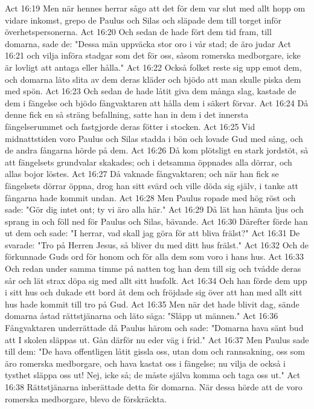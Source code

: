 Act 16:19  Men när hennes herrar sågo att det för dem var slut med allt hopp om vidare inkomst, grepo de Paulus och Silas och släpade dem till torget inför överhetspersonerna.
Act 16:20  Och sedan de hade fört dem tid fram, till domarna, sade de: "Dessa män uppväcka stor oro i vår stad; de äro judar
Act 16:21  och vilja införa stadgar som det för oss, såsom romerska medborgare, icke är lovligt att antaga eller hålla."
Act 16:22  Också folket reste sig upp emot dem, och domarna läto slita av dem deras kläder och bjödo att man skulle piska dem med spön.
Act 16:23  Och sedan de hade låtit giva dem många slag, kastade de dem i fängelse och bjödo fångvaktaren att hålla dem i säkert förvar.
Act 16:24  Då denne fick en så sträng befallning, satte han in dem i det innersta fängelserummet och fastgjorde deras fötter i stocken.
Act 16:25  Vid midnattstiden voro Paulus och Silas stadda i bön och lovade Gud med sång, och de andra fångarna hörde på dem.
Act 16:26  Då kom plötsligt en stark jordstöt, så att fängelsets grundvalar skakades; och i detsamma öppnades alla dörrar, och allas bojor löstes.
Act 16:27  Då vaknade fångvaktaren; och när han fick se fängelsets dörrar öppna, drog han sitt svärd och ville döda sig själv, i tanke att fångarna hade kommit undan.
Act 16:28  Men Paulus ropade med hög röst och sade: "Gör dig intet ont; ty vi äro alla här."
Act 16:29  Då lät han hämta ljus och sprang in och föll ned för Paulus och Silas, bävande.
Act 16:30  Därefter förde han ut dem och sade: "I herrar, vad skall jag göra för att bliva frälst?"
Act 16:31  De svarade: "Tro på Herren Jesus, så bliver du med ditt hus frälst."
Act 16:32  Och de förkunnade Guds ord för honom och för alla dem som voro i hans hus.
Act 16:33  Och redan under samma timme på natten tog han dem till sig och tvådde deras sår och lät strax döpa sig med allt sitt husfolk.
Act 16:34  Och han förde dem upp i sitt hus och dukade ett bord åt dem och fröjdade sig över att han med allt sitt hus hade kommit till tro på Gud.
Act 16:35  Men när det hade blivit dag, sände domarna åstad rättstjänarna och läto säga: "Släpp ut männen."
Act 16:36  Fångvaktaren underrättade då Paulus härom och sade: "Domarna hava sänt bud att I skolen släppas ut. Gån därför nu eder väg i frid."
Act 16:37  Men Paulus sade till dem: "De hava offentligen låtit gissla oss, utan dom och rannsakning, oss som äro romerska medborgare, och hava kastat oss i fängelse; nu vilja de också i tysthet släppa oss ut! Nej, icke så; de måste själva komma och taga oss ut."
Act 16:38  Rättstjänarna inberättade detta för domarna. När dessa hörde att de voro romerska medborgare, blevo de förskräckta.
